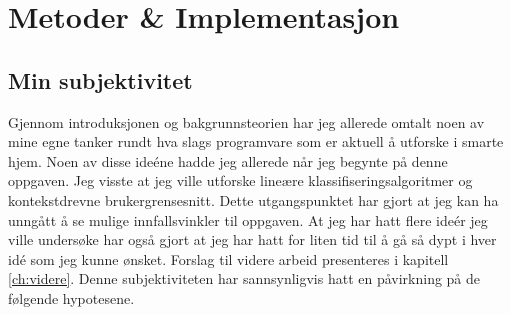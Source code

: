 \section[Metoder \& Implementasjon]{Metoder \& Implementasjon}
\subsection{Min subjektivitet}
Gjennom introduksjonen og bakgrunnsteorien har jeg allerede omtalt noen av mine egne tanker rundt hva slags programvare som er aktuell å utforske i smarte hjem. Noen av disse ideéne hadde jeg allerede når jeg begynte på denne oppgaven. Jeg visste at jeg ville utforske lineære klassifiseringsalgoritmer og kontekstdrevne brukergrensesnitt. Dette utgangspunktet har gjort at jeg kan ha unngått å se mulige innfallsvinkler til oppgaven. At jeg har hatt flere ideér jeg ville undersøke har også gjort at jeg har hatt for liten tid til å gå så dypt i hver idé som jeg kunne ønsket. Forslag til videre arbeid presenteres i kapitell \ref{ch:videre}. Denne subjektiviteten har sannsynligvis hatt en påvirkning på de følgende hypotesene.\\

